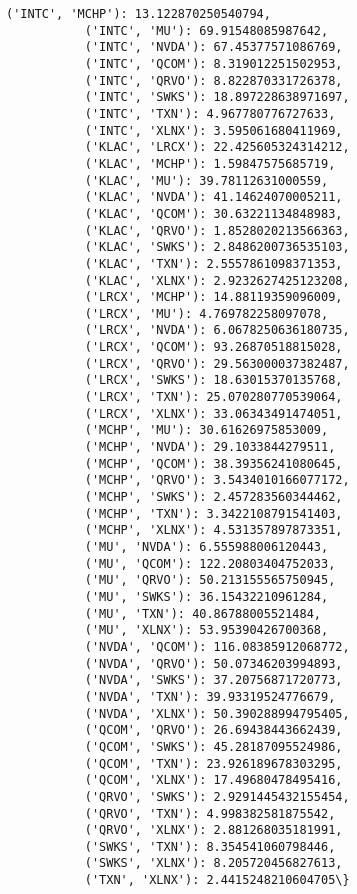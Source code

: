 \documentclass[11pt]{article}
\begin{document}
\begin{Verbatim}[commandchars=\\\{\}]
           ('INTC', 'MCHP'): 13.122870250540794,
           ('INTC', 'MU'): 69.91548085987642,
           ('INTC', 'NVDA'): 67.45377571086769,
           ('INTC', 'QCOM'): 8.319012251502953,
           ('INTC', 'QRVO'): 8.822870331726378,
           ('INTC', 'SWKS'): 18.897228638971697,
           ('INTC', 'TXN'): 4.967780776727633,
           ('INTC', 'XLNX'): 3.595061680411969,
           ('KLAC', 'LRCX'): 22.425605324314212,
           ('KLAC', 'MCHP'): 1.59847575685719,
           ('KLAC', 'MU'): 39.78112631000559,
           ('KLAC', 'NVDA'): 41.14624070005211,
           ('KLAC', 'QCOM'): 30.63221134848983,
           ('KLAC', 'QRVO'): 1.8528020213566363,
           ('KLAC', 'SWKS'): 2.8486200736535103,
           ('KLAC', 'TXN'): 2.5557861098371353,
           ('KLAC', 'XLNX'): 2.9232627425123208,
           ('LRCX', 'MCHP'): 14.88119359096009,
           ('LRCX', 'MU'): 4.769782258097078,
           ('LRCX', 'NVDA'): 6.0678250636180735,
           ('LRCX', 'QCOM'): 93.26870518815028,
           ('LRCX', 'QRVO'): 29.563000037382487,
           ('LRCX', 'SWKS'): 18.63015370135768,
           ('LRCX', 'TXN'): 25.070280770539064,
           ('LRCX', 'XLNX'): 33.06343491474051,
           ('MCHP', 'MU'): 30.61626975853009,
           ('MCHP', 'NVDA'): 29.1033844279511,
           ('MCHP', 'QCOM'): 38.39356241080645,
           ('MCHP', 'QRVO'): 3.5434010166077172,
           ('MCHP', 'SWKS'): 2.457283560344462,
           ('MCHP', 'TXN'): 3.3422108791541403,
           ('MCHP', 'XLNX'): 4.531357897873351,
           ('MU', 'NVDA'): 6.555988006120443,
           ('MU', 'QCOM'): 122.20803404752033,
           ('MU', 'QRVO'): 50.213155565750945,
           ('MU', 'SWKS'): 36.15432210961284,
           ('MU', 'TXN'): 40.86788005521484,
           ('MU', 'XLNX'): 53.95390426700368,
           ('NVDA', 'QCOM'): 116.08385912068772,
           ('NVDA', 'QRVO'): 50.07346203994893,
           ('NVDA', 'SWKS'): 37.20756871720773,
           ('NVDA', 'TXN'): 39.93319524776679,
           ('NVDA', 'XLNX'): 50.390288994795405,
           ('QCOM', 'QRVO'): 26.69438443662439,
           ('QCOM', 'SWKS'): 45.28187095524986,
           ('QCOM', 'TXN'): 23.926189678303295,
           ('QCOM', 'XLNX'): 17.49680478495416,
           ('QRVO', 'SWKS'): 2.9291445432155454,
           ('QRVO', 'TXN'): 4.998382581875542,
           ('QRVO', 'XLNX'): 2.881268035181991,
           ('SWKS', 'TXN'): 8.354541060798446,
           ('SWKS', 'XLNX'): 8.205720456827613,
           ('TXN', 'XLNX'): 2.4415248210604705\}
\end{Verbatim}
            
\end{document}
